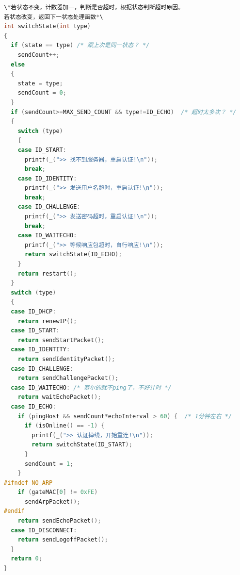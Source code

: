 \documentclass{itecreport-zh}
\begin{document}
\begin{lstlisting}[language=C]
\*若状态不变，计数器加一，判断是否超时，根据状态判断超时原因。
若状态改变，返回下一状态处理函数*\
int switchState(int type)
{
  if (state == type) /* 跟上次是同一状态？ */
    sendCount++;
  else
  {
    state = type;
    sendCount = 0;
  }
  if (sendCount>=MAX_SEND_COUNT && type!=ID_ECHO)  /* 超时太多次？ */
  {
    switch (type)
    {
    case ID_START:
      printf(_(">> 找不到服务器，重启认证!\n"));
      break;
    case ID_IDENTITY:
      printf(_(">> 发送用户名超时，重启认证!\n"));
      break;
    case ID_CHALLENGE:
      printf(_(">> 发送密码超时，重启认证!\n"));
      break;
    case ID_WAITECHO:
      printf(_(">> 等候响应包超时，自行响应!\n"));
      return switchState(ID_ECHO);
    }
    return restart();
  }
  switch (type)
  {
  case ID_DHCP:
    return renewIP();
  case ID_START:
    return sendStartPacket();
  case ID_IDENTITY:
    return sendIdentityPacket();
  case ID_CHALLENGE:
    return sendChallengePacket();
  case ID_WAITECHO: /* 塞尔的就不ping了，不好计时 */
    return waitEchoPacket();
  case ID_ECHO:
    if (pingHost && sendCount*echoInterval > 60) {  /* 1分钟左右 */
      if (isOnline() == -1) {
        printf(_(">> 认证掉线，开始重连!\n"));
        return switchState(ID_START);
      }
      sendCount = 1;
    }
#ifndef NO_ARP
    if (gateMAC[0] != 0xFE)
      sendArpPacket();
#endif
    return sendEchoPacket();
  case ID_DISCONNECT:
    return sendLogoffPacket();
  }
  return 0;
}
\end{lstlisting}
\end{document}
